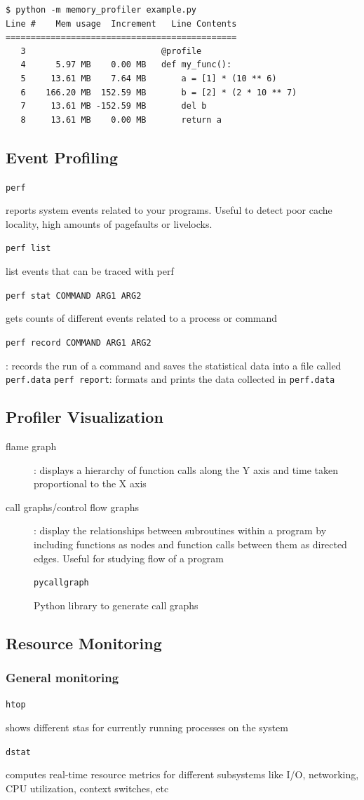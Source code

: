 \documentclass[letterpaper,12pt]{article}
\newcommand*{\lstitem}[1]{
  \setbox0\hbox{\lstinline{#1}}
  \item[\usebox0]
}
\begin{document}
\begin{lstlisting}
$ python -m memory_profiler example.py
Line #    Mem usage  Increment   Line Contents
==============================================
   3                           @profile
   4      5.97 MB    0.00 MB   def my_func():
   5     13.61 MB    7.64 MB       a = [1] * (10 ** 6)
   6    166.20 MB  152.59 MB       b = [2] * (2 * 10 ** 7)
   7     13.61 MB -152.59 MB       del b
   8     13.61 MB    0.00 MB       return a
\end{lstlisting}

\subsection{Event Profiling}
\begin{description}
 \lstitem{perf} reports system events related to your programs. Useful to detect poor cache locality, high amounts of pagefaults or livelocks.
 \lstitem{perf list} list events that can be traced with perf
 \lstitem{perf stat COMMAND ARG1 ARG2} gets counts of different events related to a process or command
 \lstitem{perf record COMMAND ARG1 ARG2}: records the run of a command and saves the statistical data into a file called \lstinline{perf.data}
 \lstinline{perf report}: formats and prints the data collected in \lstinline{perf.data}
\end{description}

\subsection{Profiler Visualization}
\begin{description}
 \item[flame graph]: displays a hierarchy of function calls along the Y axis and time taken proportional to the X axis
 \item[call graphs/control flow graphs]: display the relationships between subroutines within a program by including functions as nodes and function calls between them as directed edges. Useful for studying flow of a program
       \lstitem{pycallgraph} Python library to generate call graphs
\end{description}

\subsection{Resource Monitoring}
\subsubsection{General monitoring}
\begin{description}
 \lstitem{htop} shows different stas for currently running processes on the system
 \lstitem{dstat} computes real-time resource metrics for different subsystems like I/O, networking, CPU utilization, context switches, etc
\end{description}
\end{document}

